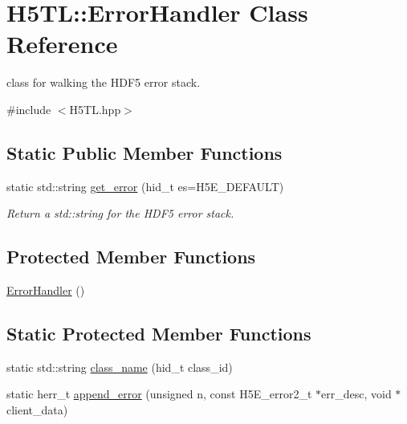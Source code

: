 \hypertarget{class_h5_t_l_1_1_error_handler}{\section{H5\-T\-L\-:\-:Error\-Handler Class Reference}
\label{class_h5_t_l_1_1_error_handler}
}


class for walking the H\-D\-F5 error stack.  




{\ttfamily \#include $<$H5\-T\-L.\-hpp$>$}

\subsection*{Static Public Member Functions}
\begin{DoxyCompactItemize}
\item 
static std\-::string \hyperlink{class_h5_t_l_1_1_error_handler_a21c2c116d3f151229d45bfed823185d6}{get\-\_\-error} (hid\-\_\-t es=H5\-E\-\_\-\-D\-E\-F\-A\-U\-L\-T)
\begin{DoxyCompactList}\small\item\em Return a std\-::string for the H\-D\-F5 error stack. \end{DoxyCompactList}\end{DoxyCompactItemize}
\subsection*{Protected Member Functions}
\begin{DoxyCompactItemize}
\item 
\hyperlink{class_h5_t_l_1_1_error_handler_ad45ba2e2661df16f5f78d4c1e9aeec33}{Error\-Handler} ()
\end{DoxyCompactItemize}
\subsection*{Static Protected Member Functions}
\begin{DoxyCompactItemize}
\item 
static std\-::string \hyperlink{class_h5_t_l_1_1_error_handler_a8197421bdfdd5f82b053e3737a90472d}{class\-\_\-name} (hid\-\_\-t class\-\_\-id)
\item 
static herr\-\_\-t \hyperlink{class_h5_t_l_1_1_error_handler_a76cbcca838c3ee2885dd2c5006735e1c}{append\-\_\-error} (unsigned n, const H5\-E\-\_\-error2\-\_\-t $\ast$err\-\_\-desc, void $\ast$client\-\_\-data)
\end{DoxyCompactItemize}
